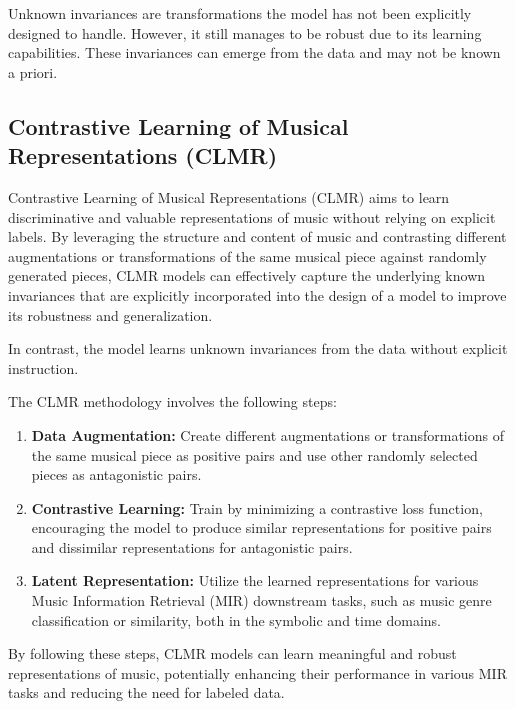 \begin{definition}

Unknown invariances are transformations the model has not been explicitly designed to handle. However, it still manages to be robust due to its learning capabilities. These invariances can emerge from the data and may not be known a priori. 
\end{definition}

\subsection{Contrastive Learning of Musical Representations (CLMR)}

Contrastive Learning of Musical Representations (CLMR) \cite{CLMR2021} aims to learn discriminative and valuable representations of music without relying on explicit labels. By leveraging the structure and content of music and contrasting different augmentations or transformations of the same musical piece against randomly generated pieces, CLMR models can effectively capture the underlying known invariances that are explicitly incorporated into the design of a model to improve its robustness and generalization.

In contrast, the model learns unknown invariances from the data without explicit instruction.

The CLMR methodology involves the following steps:

\begin{enumerate}
\item \textbf{Data Augmentation:} Create different augmentations or transformations of the same musical piece as positive pairs and use other randomly selected pieces as antagonistic pairs.
\item \textbf{Contrastive Learning:} Train by minimizing a contrastive loss function, encouraging the model to produce similar representations for positive pairs and dissimilar representations for antagonistic pairs.
\item\textbf{Latent Representation:} Utilize the learned representations for various Music Information Retrieval (MIR) downstream tasks, such as music genre classification or similarity, both in the symbolic and time domains.
\end{enumerate}

By following these steps, CLMR models can learn meaningful and robust representations of music, potentially enhancing their performance in various MIR tasks and reducing the need for labeled data.

